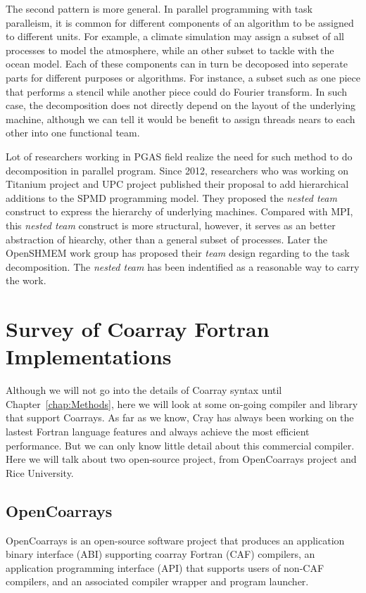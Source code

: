 The second pattern is more general. In parallel programming with task paralleism, it is common for different components of an algorithm to be assigned to different units. For example, a climate simulation may assign a subset of all processes to model the atmosphere, while an other subset to tackle with the ocean model. Each of these components can in turn be decoposed into seperate parts for different purposes or algorithms. For instance, a subset such as one piece that performs a stencil while another piece could do Fourier transform. In such case, the decomposition does not directly depend on the layout of the underlying machine, although we can tell it would be benefit to assign threads nears to each other into one functional team.

Lot of researchers working in PGAS field realize the need for such method to do decomposition in parallel program. Since 2012, researchers who was working on Titanium project and UPC project published their proposal to add hierarchical additions to the SPMD programming model\cite{kamil2012hierarchical}\cite{upc-teams}. They proposed the \textit{nested team} construct to express the hierarchy of underlying machines. Compared with MPI, this \textit{nested team} construct is more structural, however, it serves as an better abstraction of hiearchy, other than a general subset of processes. Later the OpenSHMEM work group\cite{shmem-teams} has proposed their \textit{team} design regarding to the task decomposition. The \textit{nested team} has been indentified as a reasonable way to carry the work.

\section{Survey of Coarray Fortran Implementations}\label{sec:survey}

Although we will not go into the details of Coarray syntax until Chapter~\ref{chap:Methods}, here we will look at some on-going compiler and library that support Coarrays. As far as we know, Cray has always been working on the lastest Fortran language features and always achieve the most efficient performance. But we can only know little detail about this commercial compiler. Here we will talk about two open-source project, from OpenCoarrays project and Rice University. 

\subsection{OpenCoarrays}
OpenCoarrays\cite{opencoarrays} is an open-source software project that produces an application binary interface (ABI) supporting coarray Fortran (CAF) compilers, an application programming interface (API) that supports users of non-CAF compilers, and an associated compiler wrapper and program launcher.

